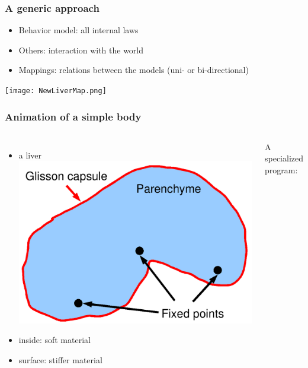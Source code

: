 \documentclass[a4paper,compress]{beamer}
\begin{document}
\begin{frame}
\frametitle{A generic approach}
\begin{itemize}
\item Behavior model: all internal laws
\item Others: interaction with the world
\item Mappings: relations between the models (uni- or bi-directional)
\end{itemize}
\begin{center}
 \texttt{[image: NewLiverMap.png]}
\end{center}

\end{frame}



\begin{frame}[fragile]
\frametitle{Animation of a simple body}
\begin{columns}

\begin{itemize}
\item a liver
\includegraphics[width=\linewidth]{liver_2ForceFields.png}
\item inside: soft material
\item surface: stiffer material
\end{itemize}

A specialized program:
\lstset{basicstyle=\large}

\end{columns}

\end{frame}
\end{document}
